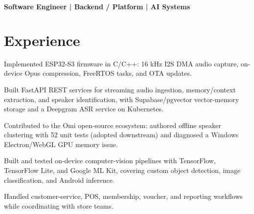 \documentclass{../../../templates/v3/resume-openfont}
\begin{document}

{\small\bfseries Software Engineer | Backend / Platform | AI Systems}\par\vspace{2pt}

\section{Experience}
\begin{resumeitemize}
\item Implemented ESP32-S3 firmware in C/C++: 16 kHz I2S DMA audio capture, on-device Opus compression, FreeRTOS tasks, and OTA updates.
\item Built FastAPI REST services for streaming audio ingestion, memory/context extraction, and speaker identification, with Supabase/pgvector vector-memory storage and a Deepgram ASR service on Kubernetes.
\item Contributed to the Omi open-source ecosystem: authored offline speaker clustering with 52 unit tests (adopted downstream) and diagnosed a Windows Electron/WebGL GPU memory issue.
\end{resumeitemize}

\begin{resumeitemize}
\item Built and tested on-device computer-vision pipelines with TensorFlow, TensorFlow Lite, and Google ML Kit, covering custom object detection, image classification, and Android inference.
\end{resumeitemize}

\begin{resumeitemize}
\item Handled customer-service, POS, membership, voucher, and reporting workflows while coordinating with store teams.
\end{resumeitemize}
\end{document}
